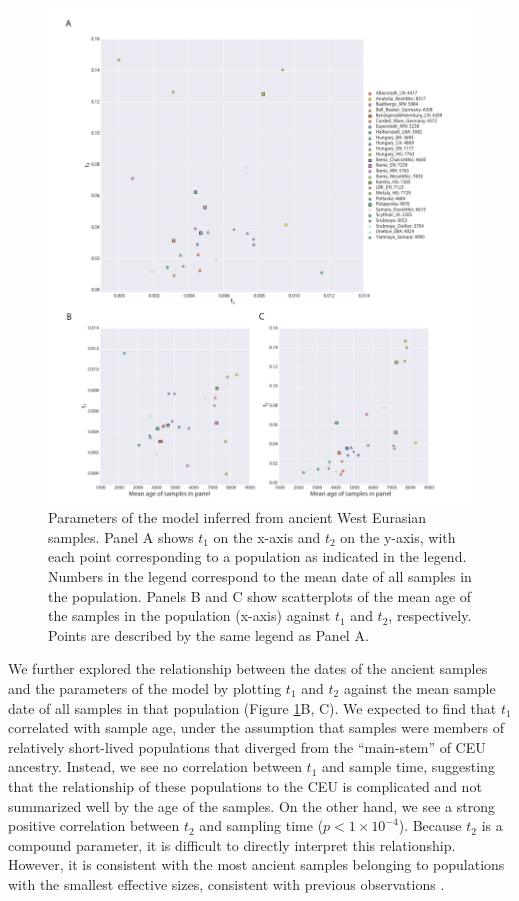 \documentclass[11pt, oneside]{article}   	%
\begin{document}
\begin{figure}[h] %
   \centering
   \includegraphics[width=\textwidth]{parameters_and_age.pdf} 
   \caption{Parameters of the model inferred from ancient West Eurasian samples. Panel A shows $t_1$ on the x-axis and $t_2$ on the y-axis, with each point corresponding to a population as indicated in the legend. Numbers in the legend correspond to the mean date of all samples in the population. Panels B and C show scatterplots of the mean age of the samples in the population (x-axis) against $t_1$ and $t_2$, respectively. Points are described by the same legend as Panel A.}
   \label{pops_together}
\end{figure}

We further explored the relationship between the dates of the ancient samples and the parameters of the model by plotting $t_1$ and $t_2$ against the mean sample date of all samples in that population (Figure \ref{pops_together}B, C). We expected to find that $t_1$ correlated with sample age, under the assumption that samples were members of relatively short-lived populations that diverged from the ``main-stem'' of CEU ancestry. Instead, we see no correlation between $t_1$ and sample time, suggesting that the relationship of these populations to the CEU is complicated and not summarized well by the age of the samples. On the other hand, we see a strong positive correlation between $t_2$ and sampling time ($p < 1\times10^{-4}$). Because $t_2$ is a compound parameter, it is difficult to directly interpret this relationship. However, it is consistent with the most ancient samples belonging to populations with the smallest effective sizes, consistent with previous observations \citep{skoglund2014genomic}. 
\end{document}
